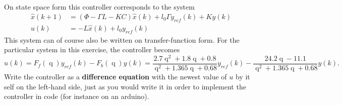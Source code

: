 \documentclass[letterpaper,12pt]{scrartcl}
\newenvironment{exercise}[1][Problem]{\begin{trivlist} \item[\hskip
    \labelsep {\stepcounter{exerctr}\bfseries #1
      \arabic{exerctr}}]}{\end{trivlist}\vspace{10mm}}
\newcounter{exerctr}
\newcommand{\bmpl}{\begin{minipage}[t]{\textwidth}}
\newcommand{\emp}{\end{minipage}}
\newcommand*{\shift}{\ensuremath{\operatorname{q}}}
\begin{document}
\begin{exercise}
\begin{center}
\end{center}

On state space form this controller corresponds to the system
\begin{equation}
  \begin{aligned}
    \hat{x}(k+1) &= \left( \Phi - \Gamma L - KC \right) \hat{x}(k) + l_0\Gamma y_{ref}(k) + Ky(k)\\
    u(k) &= -L\hat{x}(k) + l_0y_{ref}(k)
  \end{aligned}
\label{eq:observer}
\end{equation}
 This system can of course also be written on transfer-function form. For the particular system in this exercise, the controller becomes
\begin{equation}
  u(k) = F_f(\shift)y_{ref}(k) - F_b(\shift)y(k) = \frac{2.7\shift^2 + 1.8\shift + 0.8}{\shift^2 + 1.365\shift + 0.68}y_{ref}(k) - \frac{24.2\shift - 11.1}{\shift^2 + 1.365\shift + 0.68}y(k).
  \label{eq:controller}
\end{equation}
Write the controller as a \textbf{difference equation} with the newest value of $u$ by it self on the left-hand side, just as you would write it in order to implement the controller in code (for instance on an arduino).

\noindent
\fbox{
\bmpl
{\bf Calculations:}\\
\vspace*{110mm}
\emp}


\end{exercise}
\end{document}
